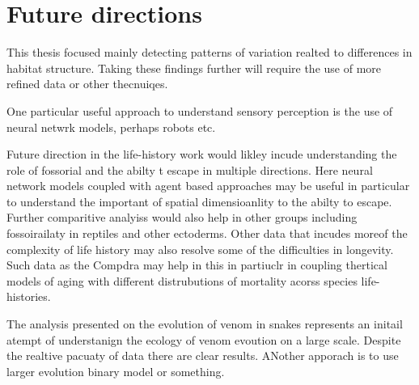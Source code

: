 \section{\uppercase{F}uture directions}

This thesis focused mainly detecting patterns of variation realted to differences in habitat structure. Taking these findings further will require the use of more refined data or other thecnuiqes.

One particular useful approach to understand sensory perception is the use of neural netwrk models, perhaps robots etc.


Future direction in the life-history work would likley incude understanding the role of fossorial and the abilty t escape in multiple directions. Here neural network models coupled with agent based approaches may be useful in particular to understand the important of spatial dimensioanlity to the abilty to escape. Further comparitive analyiss would also help in other groups including fossoirailaty in reptiles and other ectoderms. Other data that incudes moreof the complexity of life history may also resolve some of the difficulties in longevity. Such data as the Compdra may help in this in partiuclr in  coupling thertical models of aging with different distrubutions of mortality acorss species life-histories. 


The analysis presented on the evolution of venom in snakes represents an initail atempt of understanign the ecology of venom evoution on a large scale. Despite the realtive pacuaty of data there are clear results. ANother apporach is to use larger evolution binary model or something.















